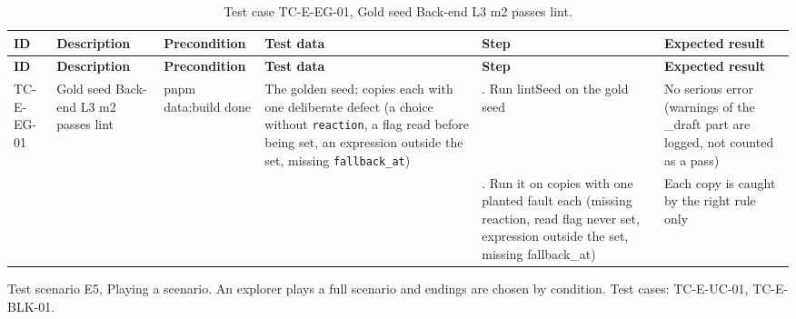 {\footnotesize{}\renewcommand{\arraystretch}{1.1}
\begin{longtable}{|>{\raggedright\arraybackslash}p{}|>{\raggedright\arraybackslash}p{}|>{\raggedright\arraybackslash}p{}|>{\raggedright\arraybackslash}p{}|>{\raggedright\arraybackslash}p{}|>{\raggedright\arraybackslash}p{}|}
\caption{Test case TC-E-EG-01, Gold seed Back-end L3 m2 passes lint.} \\
\hline
\textbf{ID} & \textbf{Description} & \textbf{Precondition} & \textbf{Test data} & \textbf{Step} & \textbf{Expected result} \\ \hline
\endfirsthead
\hline
\textbf{ID} & \textbf{Description} & \textbf{Precondition} & \textbf{Test data} & \textbf{Step} & \textbf{Expected result} \\ \hline
\endhead
TC-E-EG-01 & Gold seed Back-end L3 m2 passes lint & pnpm data:build done & The golden seed; copies each with one deliberate defect (a choice without \texttt{reaction}, a flag read before being set, an expression outside the set, missing \texttt{fallback\_\allowbreak{}at}) & 1. Run lintSeed on the gold seed & No serious error (warnings of the \_draft part are logged, not counted as a pass) \\ \cline{5-6}
 &  &  &  & 2. Run it on copies with one planted fault each (missing reaction, read flag never set, expression outside the set, missing fallback\_\allowbreak{}at) & Each copy is caught by the right rule only \\ \hline
\end{longtable}
}

Test scenario E5, Playing a scenario. An explorer plays a full scenario and endings are chosen by condition. Test cases: TC-E-UC-01, TC-\allowbreak{}E-\allowbreak{}BLK-\allowbreak{}01.


